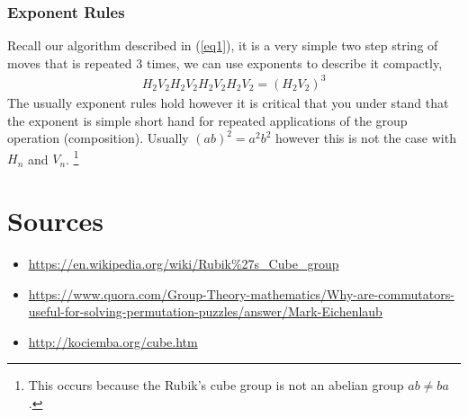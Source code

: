 \documentclass{article}
\begin{document}
\subsubsection{Exponent Rules}
Recall our algorithm described in (\ref{eq1}), it is a very simple two step string of moves that is repeated 3 times, we can use exponents to describe it compactly,
\begin{align}
    H_{2}V_{2}H_{2}V_{2}H_{2}V_{2}H_{2}V_{2}=(H_{2}V_{2})^{3}
\end{align}
The usually exponent rules hold however it is critical that you under stand that the exponent is simple short hand for repeated applications of the group operation (composition).
Usually $(ab)^2=a^2b^2$ however this is not the case with $H_{n}$ and $V_{n}$.
\footnote{This occurs because the Rubik's cube group is not an abelian group $ab\neq ba$.}
\section{Sources}
\begin{itemize}
    \item \url{https://en.wikipedia.org/wiki/Rubik\%27s\_Cube\_group}
    \item \url{https://www.quora.com/Group-Theory-mathematics/Why-are-commutators-useful-for-solving-permutation-puzzles/answer/Mark-Eichenlaub}
    \item \url{http://kociemba.org/cube.htm}
\end{itemize}
\end{document}
